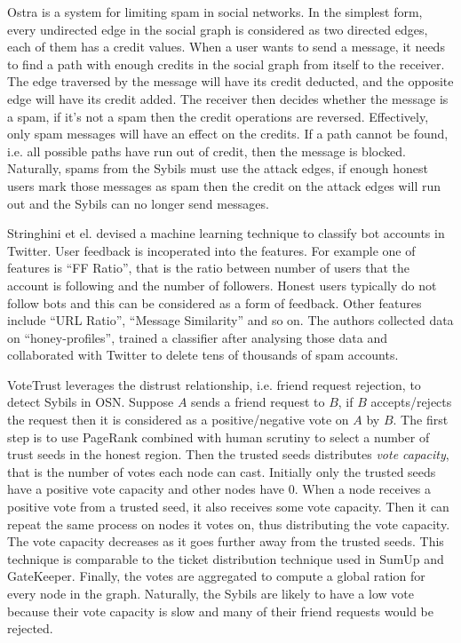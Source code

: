 Ostra\cite{mislove2008ostra} is a system for limiting spam in social networks.
In the simplest form, every undirected edge in the social graph is considered as
two directed edges, each of them has a credit values. When a user wants to send
a message, it needs to find a path with enough credits in the social graph from
itself to the receiver. The edge traversed by the message will have its credit
deducted, and the opposite edge will have its credit added. The receiver then
decides whether the message is a spam, if it's not a spam then the credit
operations are reversed. Effectively, only spam messages will have an effect on
the credits. If a path cannot be found, i.e. all possible paths have run out of
credit, then the message is blocked. Naturally, spams from the Sybils must use
the attack edges, if enough honest users mark those messages as spam then the
credit on the attack edges will run out and the Sybils can no longer send
messages.

Stringhini et el. devised a machine learning technique to classify bot accounts 
in Twitter\cite{stringhini2010detecting}. User feedback is incoperated into the
features. For example one of features is ``FF Ratio'', that is the ratio between
number of users that the account is following and the number of followers.
Honest users typically do not follow bots and this can be considered as a form
of feedback. Other features include ``URL Ratio'', ``Message Similarity'' and so
on. The authors collected data on ``honey-profiles'', trained a classifier after
analysing those data and collaborated with Twitter to delete tens of thousands
of spam accounts.

VoteTrust\cite{xue2013votetrust} leverages the distrust relationship, i.e.
friend request rejection, to detect Sybils in OSN. Suppose $A$ sends a friend
request to $B$, if $B$ accepts/rejects the request then it is considered as a
positive/negative vote on $A$ by $B$. The first step is to use PageRank combined
with human scrutiny to select a number of trust seeds in the honest region. Then
the trusted seeds distributes \emph{vote capacity}, that is the number of votes
each node can cast. Initially only the trusted seeds have a positive vote
capacity and other nodes have 0. When a node receives a positive vote from a
trusted seed, it also receives some vote capacity. Then it can repeat the same
process on nodes it votes on, thus distributing the vote capacity. The vote
capacity decreases as it goes further away from the trusted seeds. This
technique is comparable to the ticket distribution technique used in SumUp and
GateKeeper. Finally, the votes are aggregated to compute a global ration for
every node in the graph. Naturally, the Sybils are likely to have a low vote
because their vote capacity is slow and many of their friend requests would be
rejected.


